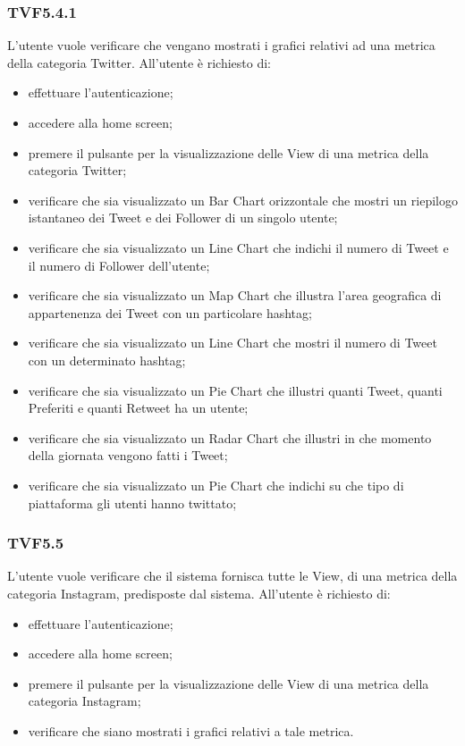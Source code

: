 		\subsubsection{TVF5.4.1}
			L'utente vuole verificare che vengano mostrati i grafici relativi ad una metrica della categoria Twitter. All'utente è richiesto di:
			\begin{itemize}
				\item effettuare l'autenticazione;
				\item accedere alla home screen;
				\item premere il pulsante per la visualizzazione delle View di una metrica della categoria Twitter;
				\item verificare che sia visualizzato un Bar Chart orizzontale che mostri un riepilogo istantaneo dei Tweet e dei Follower di un singolo utente;
				\item verificare che sia visualizzato un Line Chart che indichi il numero di Tweet e il numero di Follower dell’utente;
				\item verificare che sia visualizzato un Map Chart che illustra l'area geografica di appartenenza dei Tweet con un particolare hashtag;
				\item verificare che sia visualizzato un Line Chart che mostri il numero di Tweet con un determinato hashtag;
				\item verificare che sia visualizzato un Pie Chart che illustri quanti Tweet, quanti Preferiti e quanti Retweet ha un utente;
				\item verificare che sia visualizzato un Radar Chart che illustri in che momento della giornata vengono fatti i Tweet;
				\item verificare che sia visualizzato un Pie Chart che indichi su che tipo di piattaforma gli utenti hanno twittato;
			\end{itemize}
			
		\subsubsection{TVF5.5}
			L'utente vuole verificare che il sistema fornisca tutte le View, di una metrica della categoria Instagram, predisposte dal sistema. All'utente è richiesto di:
			\begin{itemize}
				\item effettuare l'autenticazione;
				\item accedere alla home screen;
				\item premere il pulsante per la visualizzazione delle View di una metrica della categoria Instagram;
				\item verificare che siano mostrati i grafici relativi a tale metrica.
			\end{itemize}
			
